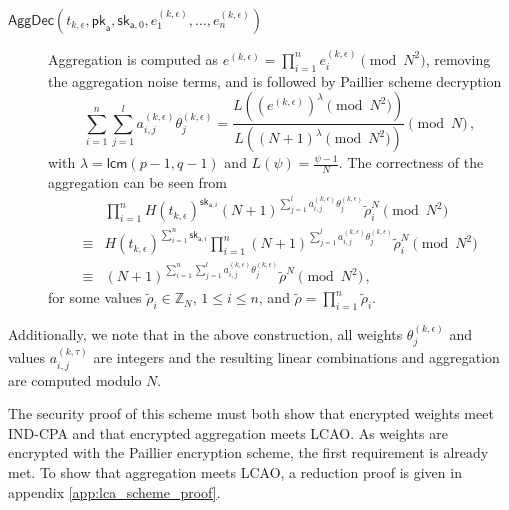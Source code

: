 \begin{description}
    \item[$\mathsf{AggDec}(t_{k,\epsilon}, \mathsf{pk}_{\mathsf{a}}, \mathsf{sk}_{\mathsf{a},0}, e^{(k,\epsilon)}_1,\dots,e^{(k,\epsilon)}_n)$] Aggregation is computed as $e^{(k,\epsilon)} = \prod^n_{i=1}e^{(k,\epsilon)}_i\pmod{N^2}$, removing the aggregation noise terms, and is followed by Paillier scheme decryption
    \begin{equation}\label{eq:nonlin_fusion:lca_scheme_decryption}
        \sum^{n}_{i=1}\sum^{l}_{j=1} a^{(k,\epsilon)}_{i,j}\theta^{(k,\epsilon)}_j = \frac{L((e^{(k,\epsilon)})^\lambda\pmod{N^2})}{L((N+1)^\lambda\pmod{N^2})} \pmod{N}\,,
    \end{equation}
    with $\lambda = \mathsf{lcm}(p-1, q-1)$ and $L(\psi) = \frac{\psi-1}{N}$. The correctness of the aggregation can be seen from
    \begin{equation*}
        \begin{split}
            & \prod^n_{i=1}H(t_{k,\epsilon})^{\mathsf{sk}_{\mathsf{a},i}}(N+1)^{\sum^{l}_{j=1}a^{(k,\epsilon)}_{i,j}\theta^{(k,\epsilon)}_j}\tilde{\rho}_i^N \pmod{N^2}\\
            \equiv& H(t_{k,\epsilon})^{\sum^n_{i=1}\mathsf{sk}_{\mathsf{a},i}}\prod^n_{i=1}(N+1)^{\sum^{l}_{j=1}a^{(k,\epsilon)}_{i,j}\theta^{(k,\epsilon)}_j}\tilde{\rho}_i^N \pmod{N^2}\\
            \equiv& (N+1)^{\sum^n_{i=1}\sum^{l}_{j=1}a^{(k,\epsilon)}_{i,j}\theta^{(k,\epsilon)}_j}\tilde{\rho}^N\pmod{N^2}\,,
            \end{split}
    \end{equation*}
    for some values $\tilde{\rho}_i \in \mathbb{Z}_N$, $1\leq i\leq n$, and $\tilde{\rho}=\prod^{n}_{i=1}\tilde{\rho}_i$.
\end{description}
Additionally, we note that in the above construction, all weights $\theta^{(k,\epsilon)}_j$ and values $a^{(k,\tau)}_{i,j}$ are integers and the resulting linear combinations and aggregation are computed modulo $N$. 

The security proof of this scheme must both show that encrypted weights meet IND-CPA and that encrypted aggregation meets LCAO. As weights are encrypted with the Paillier encryption scheme, the first requirement is already met. To show that aggregation meets LCAO, a reduction proof is given in appendix \ref{app:lca_scheme_proof}.


